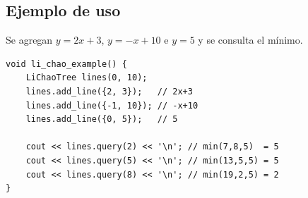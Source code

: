 \subsection{Ejemplo de uso}

Se agregan $y=2x+3$, $y=-x+10$ e $y=5$ y se consulta el m\'inimo.

\begin{lstlisting}[style=cpp]
void li_chao_example() {
    LiChaoTree lines(0, 10);
    lines.add_line({2, 3});   // 2x+3
    lines.add_line({-1, 10}); // -x+10
    lines.add_line({0, 5});   // 5

    cout << lines.query(2) << '\n'; // min(7,8,5)  = 5
    cout << lines.query(5) << '\n'; // min(13,5,5) = 5
    cout << lines.query(8) << '\n'; // min(19,2,5) = 2
}
\end{lstlisting}

